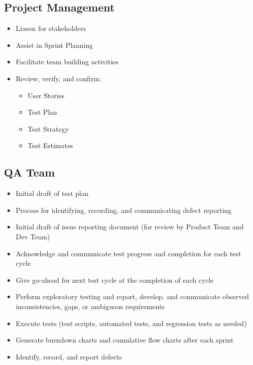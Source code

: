 \documentclass[letterpaper,10pt,english,openany,oneside]{sphinxmanual}
\begin{document}
\subsection{Project Management}
\label{\detokenize{test_plan/roles_and_responsibilities:project-management}}
\begin{itemize}
\item {} 
Liason for stakeholders

\item {} 
Assist in Sprint Planning

\item {} 
Facilitate team building activities

\item {} 
Review, verify, and confirm:
\begin{itemize}
\item {} 
User Stories

\item {} 
Test Plan

\item {} 
Test Strategy

\item {} 
Test Estimates

\end{itemize}

\end{itemize}


\subsection{QA Team}
\label{\detokenize{test_plan/roles_and_responsibilities:qa-team}}
\begin{itemize}
\item {} 
Initial draft of test plan

\item {} 
Process for identifying, recording, and communicating defect reporting

\item {} 
Initial draft of issue reporting document (for review by Product Team and Dev Team)

\item {} 
Acknowledge and communicate test progress and completion for each test cycle

\item {} 
Give go-ahead for next test cycle at the completion of each cycle

\item {} 
Perform exploratory testing and report, develop, and communicate observed inconsistencies, gaps, or ambiguous requirements

\item {} 
Execute tests (test scripts, automated tests, and regression tests as needed)

\item {} 
Generate burndown charts and cumulative flow charts after each sprint

\item {} 
Identify, record, and report defects

\end{itemize}
\end{document}
